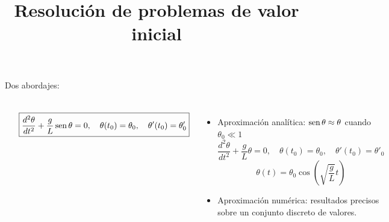 \documentclass[9pt, aspectratio=169]{beamer}
\title{Resolución de problemas de valor inicial}
\subtitle{}
\begin{document}
\maketitle

\begin{frame}{Dos abordajes:}
\begin{columns}[]
    \begin{center}
      \includegraphics[width=0.6\textwidth]{figs/pendulo.pdf}
    \end{center}
    \[ \boxed{\frac{d^2 \theta}{dt^2} + \frac{g}{L} \operatorname{sen} \theta = 0, \quad \theta(t_0) = \theta_0, \quad \theta'  (t_0) = \theta'_0} \]
\pause

    \begin{itemize}
      \item \alert{Aproximación analítica:} $ \operatorname{sen} \theta \approx \theta $ cuando $ \theta_0 \ll 1 $
    \[ \frac{d^2 \theta}{dt^2} + \frac{g}{L} \theta = 0, \quad \theta(t_0) = \theta_0, \quad \theta'  (t_0) = \theta'_0 \]
    \[ \theta(t) = \theta_0 \cos \left(\sqrt{\frac{g}{L}}t\right) \]
    \pause
\item \alert{Aproximación numérica:} resultados precisos sobre un conjunto discreto de valores.

    \end{itemize}
\end{columns}
\end{frame}
\end{document}
